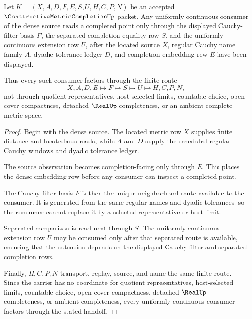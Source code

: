 \begin{theorem}
\label{thm:constructive-metric-completion-universal-handoff}
Let $K=(X,A,D,F,E,S,U,H,C,P,N)$ be an accepted $\ConstructiveMetricCompletionUp$ packet. Any uniformly continuous consumer of the dense source reads a completed point only through the displayed Cauchy-filter basis $F$, the separated completion equality row $S$, and the uniformly continuous extension row $U$, after the located source $X$, regular Cauchy name family $A$, dyadic tolerance ledger $D$, and completion embedding row $E$ have been displayed.

Thus every such consumer factors through the finite route
$$
X,A,D,E\longmapsto F\longmapsto S\longmapsto U\longmapsto H,C,P,N ,
$$
not through quotient representatives, host-selected limits, countable choice, open-cover compactness, detached $\RealUp$ completeness, or an ambient complete metric space.
\end{theorem}
\begin{proof}
Begin with the dense source. The located metric row $X$ supplies finite distance and locatedness reads, while $A$ and $D$ supply the scheduled regular Cauchy windows and dyadic tolerance ledger.

The source observation becomes completion-facing only through $E$. This places the dense embedding row before any consumer can inspect a completed point.

The Cauchy-filter basis $F$ is then the unique neighborhood route available to the consumer. It is generated from the same regular names and dyadic tolerances, so the consumer cannot replace it by a selected representative or host limit.

Separated comparison is read next through $S$. The uniformly continuous extension row $U$ may be consumed only after that separated route is available, ensuring that the extension depends on the displayed Cauchy-filter and separated completion rows.

Finally, $H,C,P,N$ transport, replay, source, and name the same finite route. Since the carrier has no coordinate for quotient representatives, host-selected limits, countable choice, open-cover compactness, detached $\RealUp$ completeness, or ambient completeness, every uniformly continuous consumer factors through the stated handoff.
\end{proof}


